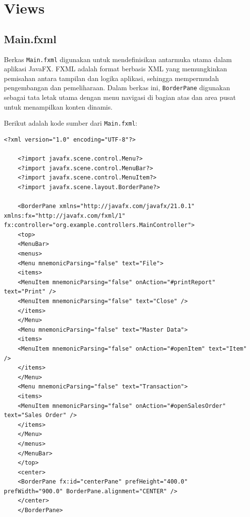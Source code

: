 \section{Views}

\subsection{Main.fxml}

Berkas \texttt{Main.fxml} digunakan untuk mendefinisikan antarmuka utama dalam aplikasi JavaFX. FXML adalah format berbasis XML yang memungkinkan pemisahan antara tampilan dan logika aplikasi, sehingga mempermudah pengembangan dan pemeliharaan. Dalam berkas ini, \texttt{BorderPane} digunakan sebagai tata letak utama dengan menu navigasi di bagian atas dan area pusat untuk menampilkan konten dinamis.

Berikut adalah kode sumber dari \texttt{Main.fxml}:

\begin{lstlisting}[style=XmlStyle]
	<?xml version="1.0" encoding="UTF-8"?>
	
	<?import javafx.scene.control.Menu?>
	<?import javafx.scene.control.MenuBar?>
	<?import javafx.scene.control.MenuItem?>
	<?import javafx.scene.layout.BorderPane?>
	
	<BorderPane xmlns="http://javafx.com/javafx/21.0.1" xmlns:fx="http://javafx.com/fxml/1" fx:controller="org.example.controllers.MainController">
	<top>
	<MenuBar>
	<menus>
	<Menu mnemonicParsing="false" text="File">
	<items>
	<MenuItem mnemonicParsing="false" onAction="#printReport" text="Print" />
	<MenuItem mnemonicParsing="false" text="Close" />
	</items>
	</Menu>
	<Menu mnemonicParsing="false" text="Master Data">
	<items>
	<MenuItem mnemonicParsing="false" onAction="#openItem" text="Item" />
	</items>
	</Menu>
	<Menu mnemonicParsing="false" text="Transaction">
	<items>
	<MenuItem mnemonicParsing="false" onAction="#openSalesOrder" text="Sales Order" />
	</items>
	</Menu>
	</menus>
	</MenuBar>
	</top>
	<center>
	<BorderPane fx:id="centerPane" prefHeight="400.0" prefWidth="900.0" BorderPane.alignment="CENTER" />
	</center>
	</BorderPane>
\end{lstlisting}


